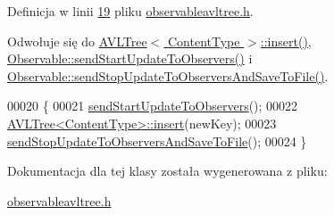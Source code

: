 Definicja w linii \hyperlink{observableavltree_8h_source_l00019}{19} pliku \hyperlink{observableavltree_8h_source}{observableavltree.\-h}.



Odwołuje się do \hyperlink{avltree_8h_source_l00049}{A\-V\-L\-Tree$<$ Content\-Type $>$\-::insert()}, \hyperlink{observable_8h_source_l00023}{Observable\-::send\-Start\-Update\-To\-Observers()} i \hyperlink{observable_8h_source_l00034}{Observable\-::send\-Stop\-Update\-To\-Observers\-And\-Save\-To\-File()}.


\begin{DoxyCode}
00020         \{
00021                 \hyperlink{class_observable_a78df64057f152342a43f27979186a6ba}{sendStartUpdateToObservers}();
00022                         \hyperlink{class_a_v_l_tree_a3a85ff5f0b56af6c8b358611f8de95af}{AVLTree<ContentType>::insert}(newKey);
00023                 \hyperlink{class_observable_a2deff078096cccc4f2fb3293d1a3e8ff}{sendStopUpdateToObserversAndSaveToFile}();
00024         \}
\end{DoxyCode}


Dokumentacja dla tej klasy została wygenerowana z pliku\-:\begin{DoxyCompactItemize}
\item 
\hyperlink{observableavltree_8h}{observableavltree.\-h}\end{DoxyCompactItemize}
